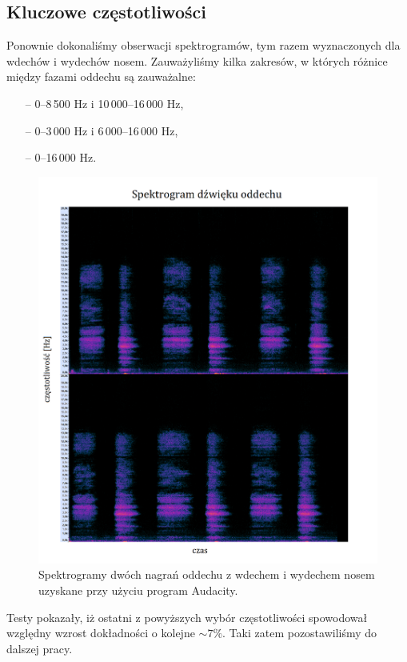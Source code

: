 \documentclass[polish]{article}
\begin{document}
\subsection{Kluczowe częstotliwości}
Ponownie dokonaliśmy obserwacji spektrogramów, tym razem wyznaczonych dla wdechów i wydechów nosem. Zauważyliśmy kilka zakresów, w których różnice między fazami oddechu są zauważalne:
\begin{itemize}
	\setlength\itemsep{-0.25em}
	\item[--] 0--8\,500 \unit{Hz} i 10\,000--16\,000 \unit{Hz},
	\item[--] 0--3\,000 \unit{Hz} i 6\,000--16\,000 \unit{Hz},
	\item[--] 0--16\,000 \unit{Hz}.
\end{itemize}
\begin{figure}[H]
	\centering
	\includegraphics[width=13cm]{spektrogram_wydech_nosem}
	\caption{Spektrogramy dwóch nagrań oddechu z wdechem i wydechem nosem uzyskane przy użyciu program Audacity.}
\end{figure}
Testy pokazały, iż ostatni z powyższych wybór częstotliwości spowodował względny wzrost dokładności o kolejne $\sim7\%$. Taki zatem pozostawiliśmy do dalszej pracy.
\end{document}
